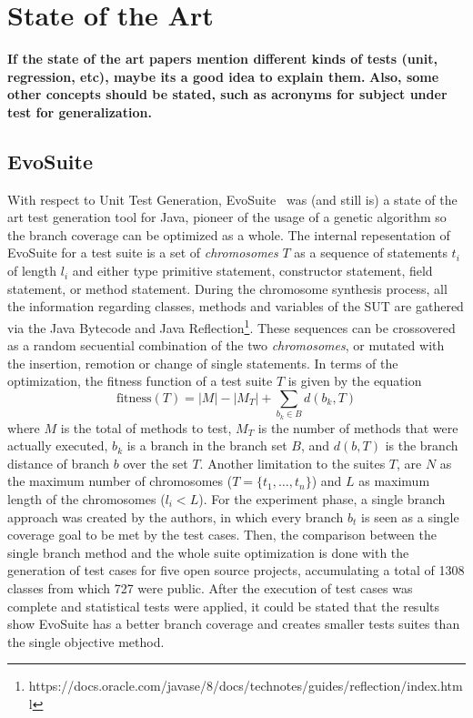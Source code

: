 \documentclass[%
  chapterprefix=false,%
  open=right,%
  twoside=true,%
  paper=a4,%
  logofile={Figures/logo.png},%
  thesistype=master,%
  UKenglish,%
]{se2thesis}
\begin{document}
\chapter{State of the Art}

\textbf{If the state of the art papers mention different kinds of tests (unit, regression, etc), maybe its a good idea to explain them.}
\textbf{Also, some other concepts should be stated, such as acronyms for subject under test for generalization.}

\section{EvoSuite}
With respect to Unit Test Generation, EvoSuite~\cite{DBLP:conf/qsic/FraserA11} was (and still is) a state of the art test generation tool for Java, pioneer of the usage of a genetic algorithm so the branch coverage can be optimized as a whole.
The internal repesentation of EvoSuite for a test suite is a set of \textit{chromosomes} $T$ as a sequence of statements $t_i$ of length $l_i$ and either type primitive statement, constructor statement, field statement, or method statement.
During the chromosome synthesis process, all the information regarding classes, methods and variables of the SUT are gathered via the Java Bytecode and Java Reflection\footnote{https://docs.oracle.com/javase/8/docs/technotes/guides/reflection/index.html}.
These sequences can be crossovered as a random secuential combination of the two \textit{chromosomes}, or mutated with the insertion, remotion or change of single statements.
In terms of the optimization, the fitness function of a test suite $T$ is given by the equation
\[ \text{fitness}(T) = |M| - |M_T| + \sum_{b_k \in B} d(b_k, T) \]
where $M$ is the total of methods to test, $M_T$ is the number of methods that were actually executed, $b_k$ is a branch in the branch set $B$, and $d(b, T)$ is the branch distance of branch $b$ over the set $T$.
Another limitation to the suites $T$, are $N$ as the maximum number of chromosomes ($T = \{t_1, \dots , t_n\}$) and $L$ as maximum length of the chromosomes ($l_i < L$).
For the experiment phase, a single branch approach was created by the authors, in which every branch $b_t$ is seen as a single coverage goal to be met by the test cases.
Then, the comparison between the single branch method and the whole suite optimization is done with the generation of test cases for five open source projects, accumulating a total of 1308 classes from which 727 were public.
After the execution of test cases was complete and statistical tests were applied, it could be stated that the results show EvoSuite has a better branch coverage and creates smaller tests suites than the single objective method.
\end{document}
